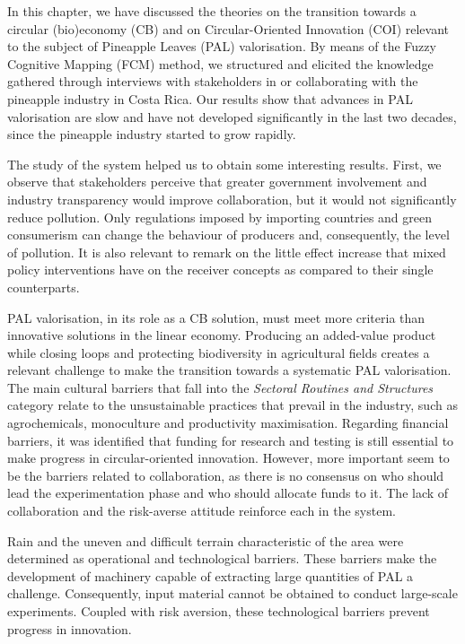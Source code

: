 In this chapter, we have discussed the theories on the transition towards a circular (bio)economy (CB) and on Circular-Oriented Innovation (COI) relevant to the subject of Pineapple Leaves (PAL) valorisation. By means of the Fuzzy Cognitive Mapping (FCM) method, we structured and elicited the knowledge gathered through interviews with stakeholders in or collaborating with the pineapple industry in Costa Rica. Our results show that advances in PAL valorisation are slow and have not developed significantly in the last two decades, since the pineapple industry started to grow rapidly. 

The study of the system helped us to obtain some interesting results. First, we observe that stakeholders perceive that greater government involvement and industry transparency would improve collaboration, but it would not significantly reduce pollution. Only regulations imposed by importing countries and green consumerism can change the behaviour of producers and, consequently, the level of pollution. It is also relevant to remark on the little effect increase that mixed policy interventions have on the receiver concepts as compared to their single counterparts.

PAL valorisation, in its role as a CB solution, must meet more criteria than innovative solutions in the linear economy. Producing an added-value product while closing loops and protecting biodiversity in agricultural fields creates a relevant challenge to make the transition towards a systematic PAL valorisation. The main cultural barriers that fall into the \textit{Sectoral Routines and Structures} category relate to the unsustainable practices that prevail in the industry, such as agrochemicals, monoculture and productivity maximisation. Regarding financial barriers, it was identified that funding for research and testing is still essential to make progress in circular-oriented innovation. However, more important seem to be the barriers related to collaboration, as there is no consensus on who should lead the experimentation phase and who should allocate funds to it. The lack of collaboration and the risk-averse attitude reinforce each in the system.

Rain and the uneven and difficult terrain characteristic of the area were determined as operational and technological barriers. These barriers make the development of machinery capable of extracting large quantities of PAL a challenge. Consequently, input material cannot be obtained to conduct large-scale experiments. Coupled with risk aversion, these technological barriers prevent progress in innovation. 

